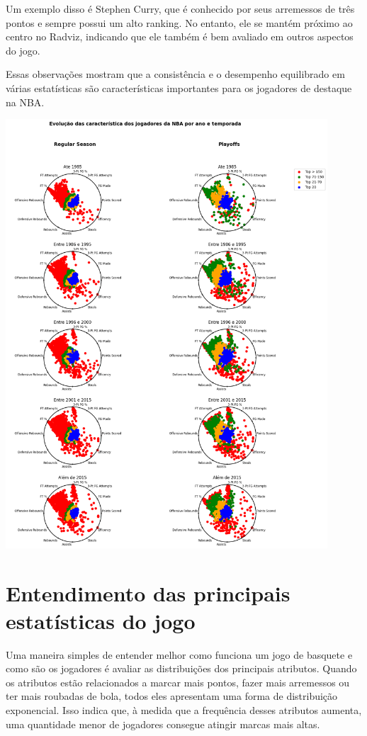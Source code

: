 \documentclass[
]{book}
\begin{document}
Um exemplo disso é Stephen Curry, que é conhecido por seus arremessos de três pontos e sempre possui um alto ranking. No entanto, ele se mantém próximo ao centro no Radviz, indicando que ele também é bem avaliado em outros aspectos do jogo.

Essas observações mostram que a consistência e o desempenho equilibrado em várias estatísticas são características importantes para os jogadores de destaque na NBA.

\includegraphics[width=0.9\textwidth,height=\textheight]{imagens/14.png}

\hypertarget{entendimento-das-principais-estatuxedsticas-do-jogo}{%
\chapter{Entendimento das principais estatísticas do jogo}\label{entendimento-das-principais-estatuxedsticas-do-jogo}}

Uma maneira simples de entender melhor como funciona um jogo de basquete e como são os jogadores é avaliar as distribuições dos principais atributos. Quando os atributos estão relacionados a marcar mais pontos, fazer mais arremessos ou ter mais roubadas de bola, todos eles apresentam uma forma de distribuição exponencial. Isso indica que, à medida que a frequência desses atributos aumenta, uma quantidade menor de jogadores consegue atingir marcas mais altas.
\end{document}
